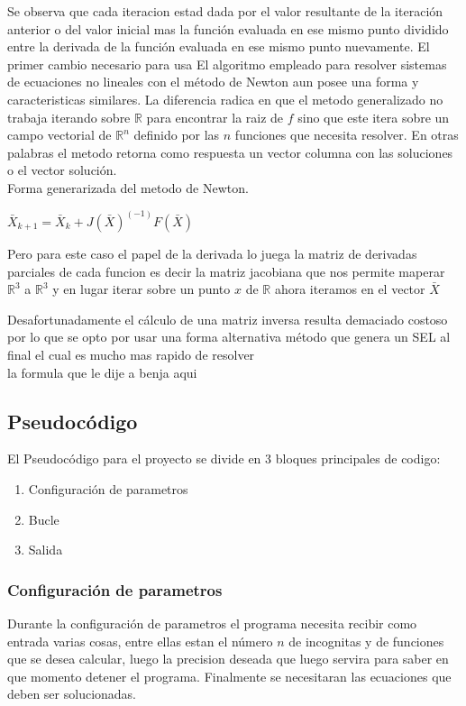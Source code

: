 \documentclass[11pt]{article}
\begin{document}
Se observa que cada iteracion estad dada por el valor resultante de la iteración anterior o del valor inicial mas la función evaluada en ese mismo punto dividido entre la derivada de la función evaluada en ese mismo punto nuevamente. El primer cambio necesario para usa 
 El algoritmo empleado para resolver sistemas de ecuaciones no lineales con el método de Newton aun posee una forma y caracteristicas similares. La diferencia radica en que el metodo generalizado no trabaja iterando sobre $\mathbb{R}$ para encontrar la raiz de $f$ sino que este itera sobre un campo vectorial de $\mathbb{R}^n$ definido por las $n$ funciones que necesita resolver. En otras palabras el metodo retorna como respuesta un vector columna con las soluciones o el vector solución.\\

Forma generarizada del metodo de Newton.
 
\begin{center}
$\bar{X}_{k+1} = \bar{X}_{k} + J(\bar{X})^(-1)F(\bar{X})  \label{eq:2}$
\end{center}

Pero para este caso el papel de la derivada lo juega la matriz de derivadas parciales de cada funcion es decir la matriz jacobiana que nos permite maperar  $\mathbb{R}^3$ a $\mathbb{R}^3$ y en lugar iterar sobre un punto $x$ de $\mathbb{R}$  ahora iteramos en el vector $\bar{X}$

Desafortunadamente el cálculo de una matriz inversa resulta demaciado costoso por lo que se opto por usar una forma alternativa método que genera un SEL al final el cual es mucho mas rapido de resolver\\

{la formula que le dije a benja aqui }

\subsection{Pseudocódigo}
El Pseudocódigo para el proyecto se divide en 3 bloques principales de codigo:
\begin{enumerate}
  \item Configuración de parametros
  \item Bucle
  \item Salida
\end{enumerate}

\subsubsection{Configuración de parametros}
Durante la configuración de parametros el programa necesita recibir como entrada varias cosas, entre ellas estan el número  $n$ de incognitas y de funciones que se desea calcular, luego la precision deseada que luego servira para saber en que momento detener el programa. Finalmente se necesitaran las ecuaciones que deben ser solucionadas.
\end{document}
